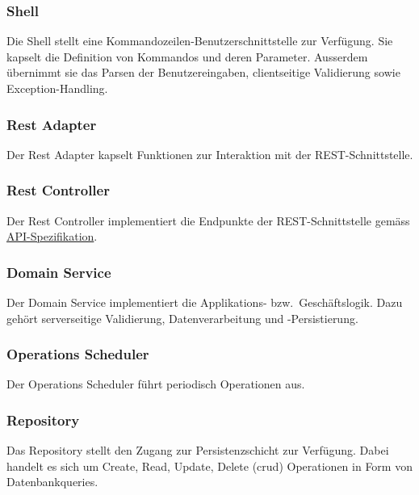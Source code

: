\documentclass[a4paper,12pt]{report}
\begin{document}
    \newpage

    \subsubsection{Shell}\label{subsubsec:shell}
    Die Shell stellt eine Kommandozeilen-Benutzerschnittstelle zur Verfügung.
    Sie kapselt die Definition von Kommandos und deren Parameter.
    Ausserdem übernimmt sie das Parsen der Benutzereingaben, clientseitige Validierung sowie Exception-Handling.

    \subsubsection{Rest Adapter}\label{subsubsec:rest-adapter}
    Der Rest Adapter kapselt Funktionen zur Interaktion mit der REST-Schnittstelle.

    \subsubsection{Rest Controller}
    Der Rest Controller implementiert die Endpunkte der REST-Schnittstelle gemäss \hyperref[sec:api-spec]{API-Spezifikation}.

    \subsubsection{Domain Service}
    Der Domain Service implementiert die Applikations- bzw.\ Geschäftslogik.
    Dazu gehört serverseitige Validierung, Datenverarbeitung und -Persistierung.

    \subsubsection{Operations Scheduler}
    Der Operations Scheduler führt periodisch Operationen aus.

    \subsubsection{Repository}
    Das Repository stellt den Zugang zur Persistenzschicht zur Verfügung.
    Dabei handelt es sich um Create, Read, Update, Delete (\gls{crud}) Operationen in Form von Datenbankqueries.
\end{document}
